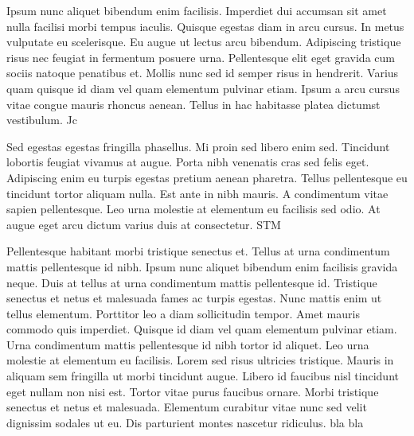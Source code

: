 Ipsum nunc aliquet bibendum enim facilisis. Imperdiet dui accumsan sit amet nulla facilisi morbi tempus iaculis. Quisque egestas diam in arcu cursus. In metus vulputate eu scelerisque. Eu augue ut lectus arcu bibendum. Adipiscing tristique risus nec feugiat in fermentum posuere urna. Pellentesque elit eget gravida cum sociis natoque penatibus et. Mollis nunc sed id semper risus in hendrerit. Varius quam quisque id diam vel quam elementum pulvinar etiam. Ipsum a arcu cursus vitae congue mauris rhoncus aenean. Tellus in hac habitasse platea dictumst vestibulum. \gls{Jc} 


Sed egestas egestas fringilla phasellus. Mi proin sed libero enim sed. Tincidunt lobortis feugiat vivamus at augue. Porta nibh venenatis cras sed felis eget. Adipiscing enim eu turpis egestas pretium aenean pharetra. Tellus pellentesque eu tincidunt tortor aliquam nulla. Est ante in nibh mauris. A condimentum vitae sapien pellentesque. Leo urna molestie at elementum eu facilisis sed odio. At augue eget arcu dictum varius duis at consectetur. \gls{STM} 

Pellentesque habitant morbi tristique senectus et. Tellus at urna condimentum mattis pellentesque id nibh. Ipsum nunc aliquet bibendum enim facilisis gravida neque. Duis at tellus at urna condimentum mattis pellentesque id. Tristique senectus et netus et malesuada fames ac turpis egestas. Nunc mattis enim ut tellus elementum. Porttitor leo a diam sollicitudin tempor. Amet mauris commodo quis imperdiet. Quisque id diam vel quam elementum pulvinar etiam. Urna condimentum mattis pellentesque id nibh tortor id aliquet. Leo urna molestie at elementum eu facilisis. Lorem sed risus ultricies tristique. Mauris in aliquam sem fringilla ut morbi tincidunt augue. Libero id faucibus nisl tincidunt eget nullam non nisi est. Tortor vitae purus faucibus ornare. Morbi tristique senectus et netus et malesuada. Elementum curabitur vitae nunc sed velit dignissim sodales ut eu. Dis parturient montes nascetur ridiculus.
bla bla \cite{Newton1700}